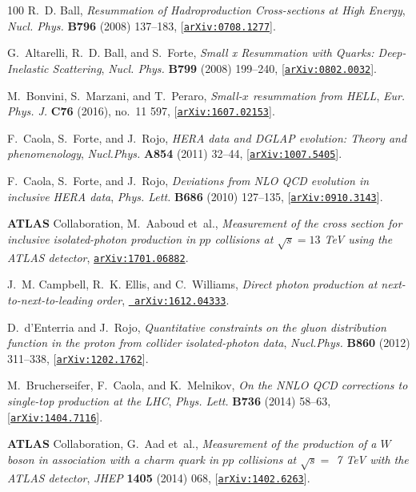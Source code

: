 \begin{thebibliography}{100}
R.~D. Ball, {\it {Resummation of Hadroproduction Cross-sections at High
  Energy}},  {\em Nucl. Phys.} {\bf B796} (2008) 137--183,
  [\href{http://arxiv.org/abs/0708.1277}{{\tt arXiv:0708.1277}}].

G.~Altarelli, R.~D. Ball, and S.~Forte, {\it {Small x Resummation with Quarks:
  Deep-Inelastic Scattering}},  {\em Nucl. Phys.} {\bf B799} (2008) 199--240,
  [\href{http://arxiv.org/abs/0802.0032}{{\tt arXiv:0802.0032}}].

M.~Bonvini, S.~Marzani, and T.~Peraro, {\it {Small-$x$ resummation from HELL}},
   {\em Eur. Phys. J.} {\bf C76} (2016), no.~11 597,
  [\href{http://arxiv.org/abs/1607.02153}{{\tt arXiv:1607.02153}}].

F.~Caola, S.~Forte, and J.~Rojo, {\it {HERA data and DGLAP evolution: Theory
  and phenomenology}},  {\em Nucl.Phys.} {\bf A854} (2011) 32--44,
  [\href{http://arxiv.org/abs/1007.5405}{{\tt arXiv:1007.5405}}].

F.~Caola, S.~Forte, and J.~Rojo, {\it {Deviations from NLO QCD evolution in
  inclusive HERA data}},  {\em Phys. Lett.} {\bf B686} (2010) 127--135,
  [\href{http://arxiv.org/abs/0910.3143}{{\tt arXiv:0910.3143}}].

{\bf ATLAS} Collaboration, M.~Aaboud et~al., {\it {Measurement of the cross
  section for inclusive isolated-photon production in $pp$ collisions at $\sqrt
  s=13$ TeV using the ATLAS detector}},
  \href{http://arxiv.org/abs/1701.06882}{{\tt arXiv:1701.06882}}.

J.~M. Campbell, R.~K. Ellis, and C.~Williams, {\it {Direct photon production at
  next-to-next-to-leading order}},  \href{http://arxiv.org/abs/1612.04333}{{\tt
  arXiv:1612.04333}}.

D.~d'Enterria and J.~Rojo, {\it {Quantitative constraints on the gluon
  distribution function in the proton from collider isolated-photon data}},
  {\em Nucl.Phys.} {\bf B860} (2012) 311--338,
  [\href{http://arxiv.org/abs/1202.1762}{{\tt arXiv:1202.1762}}].

M.~Brucherseifer, F.~Caola, and K.~Melnikov, {\it {On the NNLO QCD corrections
  to single-top production at the LHC}},  {\em Phys. Lett.} {\bf B736} (2014)
  58--63, [\href{http://arxiv.org/abs/1404.7116}{{\tt arXiv:1404.7116}}].

{\bf ATLAS} Collaboration, G.~Aad et~al., {\it {Measurement of the production
  of a $W$ boson in association with a charm quark in $pp$ collisions at
  $\sqrt{s} =$ 7 TeV with the ATLAS detector}},  {\em JHEP} {\bf 1405} (2014)
  068, [\href{http://arxiv.org/abs/1402.6263}{{\tt arXiv:1402.6263}}].


\end{thebibliography}
